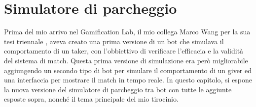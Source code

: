 \documentclass[main.tex]{subfiles}
\begin{document}
\sloppy


\vspace{1.0cm}

\chapter{Simulatore di parcheggio}\label{sec:Simulazione}

Prima del mio arrivo nel Gamification Lab, il mio collega Marco Wang per la sua tesi triennale \cite{TesiMW}, aveva creato una prima versione di un bot che simulava il comportamento di un taker, con l'obbiettivo di verificare l’efficacia e la validità del sistema di match. \newline
Questa prima versione di simulazione era però migliorabile aggiungendo un secondo tipo di bot per simulare il comportamento di un giver ed una interfaccia per mostrare il match in tempo reale. \newline
In questo capitolo, si espone la nuova versione del simulatore di parcheggio tra bot con tutte le aggiunte esposte sopra, nonché il tema principale del mio tirocinio.  
\end{document}
